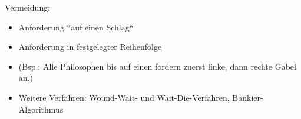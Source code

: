 Vermeidung:
\begin{itemize}
    \item Anforderung ``auf einen Schlag``
    \item Anforderung in festgelegter Reihenfolge
    \item[] (Bsp.: Alle Philosophen bis auf einen fordern zuerst linke, dann rechte Gabel an.)
    \item Weitere Verfahren: Wound-Wait- und Wait-Die-Verfahren, Bankier-Algorithmus
\end{itemize}
